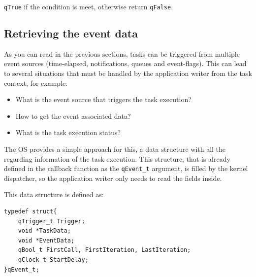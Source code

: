 \documentclass{article}
\begin{document}
\lstinline{qTrue} if the condition is meet, otherwise return \lstinline{qFalse}.


\subsection{Retrieving the event data} \label{eventdata} 
As you can read in the previous sections, tasks can be triggered from multiple event sources (time-elapsed, notifications, queues and event-flags). This can lead to several situations that must be handled by the application writer from the task context, for example:

\begin{itemize}
    \item What is the event source that triggers the task execution?
    \item How to get the event associated data?
    \item What is the task execution status? 
\end{itemize}

The OS provides a simple approach for this, a data structure with all the regarding information of the task execution. This structure, that is already defined in the callback function as the \lstinline{qEvent_t} argument, is filled by the kernel dispatcher, so the application writer only needs to read the fields inside.

This data structure is defined as: \\

\begin{lstlisting}[style=CStyle]
typedef struct{
    qTrigger_t Trigger;
    void *TaskData;
    void *EventData;
    qBool_t FirstCall, FirstIteration, LastIteration;
    qClock_t StartDelay;
}qEvent_t;
\end{lstlisting}
\end{document}

